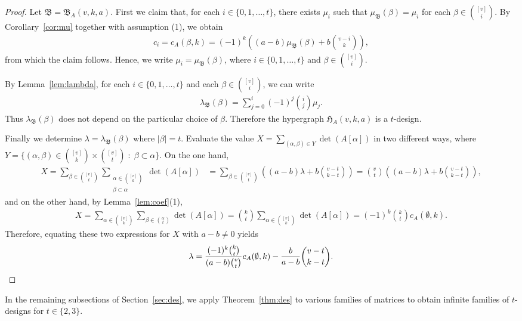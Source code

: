 \documentclass[11pt]{article}
\begin{document}
\begin{proof}
Let $\mathfrak B = \mathfrak B_A(v,k,a)$.
First we claim that, for each $i \in \{0,1,\dots,t\}$, there exists $\mu_i$ such that $\mu_\mathfrak B(\beta) = \mu_i$ for each $\beta \in \binom{[v]}{i}$. 
By Corollary~\ref{cor:mu} 
together with assumption (1), we obtain 
\begin{align*}
    c_i = c_A(\beta,k)=(-1)^{k}\left((a-b)\mu_\mathfrak B(\beta)+b\binom{v-i}{k}\right),
\end{align*}
from which the claim follows.
Hence, we write $\mu_i=\mu_\mathfrak B(\beta)$, where $i\in\{0,1,\dots,t\}$ and $\beta \in \binom{[v]}{i}$. 

By Lemma~\ref{lem:lambda}, for each $i\in\{0,1,\dots,t\}$ and each $\beta \in \binom{[v]}{i}$, we can write
\begin{align*}
    \lambda_\mathfrak B(\beta)=\sum_{j=0}^i (-1)^j \binom{i}{j}\mu_j.
\end{align*}
Thus $\lambda_\mathfrak B(\beta)$ does not depend on the particular choice of $\beta$. 
Therefore the hypergraph $\mathfrak H_{A}(v,k,a)$ is a $t$-design.  

Finally we determine $\lambda=\lambda_\mathfrak B(\beta)$ where $|\beta|=t$. 
Evaluate the value  
$\displaystyle 
X=\sum_{(\alpha,\beta)\in Y}\det (A[\alpha])
$
in two different ways, where $Y=\{(\alpha,\beta)\in\binom{[v]}{k}\times\binom{[v]}{t}  \; : \;  \beta\subset \alpha\}$. 
On the one hand,
\begin{align*}
X=\sum_{\beta\in\binom{[v]}{t}}\sum_{\substack{\alpha\in\binom{[v]}{k} \\ \beta \subset \alpha }}\det (A[\alpha])&=\sum_{\beta\in\binom{[v]}{t}}\left((a-b)\lambda+b\binom{v-t}{k-t}\right)=\binom{v}{t}\left((a-b)\lambda+b\binom{v-t}{k-t}\right),
\end{align*}
and on the other hand, by Lemma~\ref{lem:coef}(1),
\begin{align*}
    X=\sum_{\alpha\in\binom{[v]}{k}}\sum_{\beta\in\binom{\alpha}{t}}\det (A[\alpha])=\binom{k}{t}\sum_{\alpha\in\binom{[v]}{k}}\det (A[\alpha])=(-1)^k\binom{k}{t}c_A(\emptyset,k). 
\end{align*}  
Therefore, equating these two expressions for $X$ with $a-b\neq0$ yields  
\[
    \lambda=\frac{(-1)^k\binom{k}{t}}{(a-b)\binom{v}{t}}c_A(\emptyset,k)-\frac{b}{a-b}\binom{v-t}{k-t}.\qedhere
\]
\end{proof}
In the remaining subsections of Section~\ref{sec:des}, we apply Theorem~\ref{thm:des} to various families of matrices to obtain infinite families of $t$-designs for $t \in \{2,3\}$.
\end{document}
